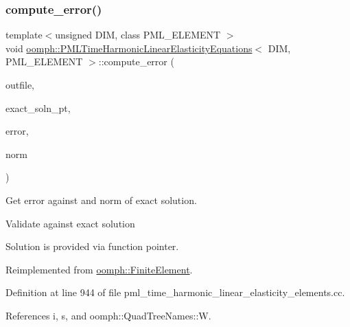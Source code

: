 \subsubsection{\texorpdfstring{compute\+\_\+error()}{compute\_error()}\hspace{0.1cm}{\footnotesize\ttfamily [1/2]}}
{\footnotesize\ttfamily template$<$unsigned D\+IM, class P\+M\+L\+\_\+\+E\+L\+E\+M\+E\+NT $>$ \\
void \hyperlink{classoomph_1_1PMLTimeHarmonicLinearElasticityEquations}{oomph\+::\+P\+M\+L\+Time\+Harmonic\+Linear\+Elasticity\+Equations}$<$ D\+IM, P\+M\+L\+\_\+\+E\+L\+E\+M\+E\+NT $>$\+::compute\+\_\+error (\begin{DoxyParamCaption}\item[{std\+::ostream \&}]{outfile,  }\item[{\hyperlink{classoomph_1_1FiniteElement_a690fd33af26cc3e84f39bba6d5a85202}{Finite\+Element\+::\+Steady\+Exact\+Solution\+Fct\+Pt}}]{exact\+\_\+soln\+\_\+pt,  }\item[{double \&}]{error,  }\item[{double \&}]{norm }\end{DoxyParamCaption})\hspace{0.3cm}{\ttfamily [virtual]}}



Get error against and norm of exact solution. 

Validate against exact solution

Solution is provided via function pointer. 

Reimplemented from \hyperlink{classoomph_1_1FiniteElement_a73c79a1f1e5b1d334757812a6bbd58ff}{oomph\+::\+Finite\+Element}.



Definition at line 944 of file pml\+\_\+time\+\_\+harmonic\+\_\+linear\+\_\+elasticity\+\_\+elements.\+cc.



References i, s, and oomph\+::\+Quad\+Tree\+Names\+::W.

\mbox{\label{classoomph_1_1PMLTimeHarmonicLinearElasticityEquations_a5260b08e4acb416b0ca815097d8da246}} 
